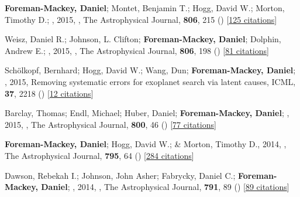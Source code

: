 \item[{\color{numcolor}\scriptsize10}] \textbf{Foreman-Mackey, Daniel}; Montet, Benjamin T.; Hogg, David W.; Morton, Timothy D.; \etal, 2015, , The Astrophysical Journal, \textbf{806}, 215 () [\href{https://ui.adsabs.harvard.edu/abs/2015ApJ...806..215F}{125 citations}]

\item[{\color{numcolor}\scriptsize9}] Weisz, Daniel R.; Johnson, L. Clifton; \textbf{Foreman-Mackey, Daniel}; Dolphin, Andrew E.; \etal, 2015, , The Astrophysical Journal, \textbf{806}, 198 () [\href{https://ui.adsabs.harvard.edu/abs/2015ApJ...806..198W}{81 citations}]

\item[{\color{numcolor}\scriptsize8}] Sch{\"o}lkopf, Bernhard; Hogg, David W.; Wang, Dun; \textbf{Foreman-Mackey, Daniel}; \etal, 2015, Removing systematic errors for exoplanet search via latent causes, ICML, \textbf{37}, 2218 () [\href{https://scholar.google.com/scholar?cites=11768165421845046384}{12 citations}]

\item[{\color{numcolor}\scriptsize7}] Barclay, Thomas; Endl, Michael; Huber, Daniel; \textbf{Foreman-Mackey, Daniel}; \etal, 2015, , The Astrophysical Journal, \textbf{800}, 46 () [\href{https://ui.adsabs.harvard.edu/abs/2015ApJ...800...46B}{77 citations}]

\item[{\color{numcolor}\scriptsize6}] \textbf{Foreman-Mackey, Daniel}; Hogg, David W.; \& Morton, Timothy D., 2014, , The Astrophysical Journal, \textbf{795}, 64 () [\href{https://ui.adsabs.harvard.edu/abs/2014ApJ...795...64F}{284 citations}]

\item[{\color{numcolor}\scriptsize5}] Dawson, Rebekah I.; Johnson, John Asher; Fabrycky, Daniel C.; \textbf{Foreman-Mackey, Daniel}; \etal, 2014, , The Astrophysical Journal, \textbf{791}, 89 () [\href{https://ui.adsabs.harvard.edu/abs/2014ApJ...791...89D}{89 citations}]

